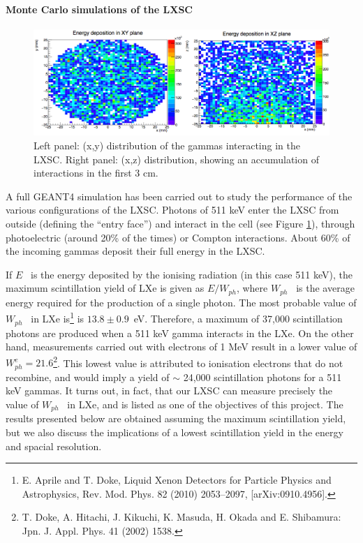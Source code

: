 \paragraph{Monte Carlo simulations of the LXSC}

\begin{figure}[!htb]
	\centering
	\includegraphics[scale=0.5]{img/gammas.png}
	\caption{\label{fig.gammas}  Left panel: (x,y) distribution of the gammas interacting in the LXSC. Right panel: (x,z) distribution, showing an accumulation of interactions in the first 3 cm.  }
\end{figure}

A full GEANT4 simulation has been carried out to study the performance of the various configurations of the LXSC. Photons of 511 keV enter the LXSC from outside (defining the ``entry face'') and interact in the cell (see Figure \ref{fig.gammas}), through photoelectric (around 20\% of the times) or Compton interactions. About 60\% of the incoming gammas deposit their full energy in the LXSC. 

If $E$~ is the energy deposited by the ionising radiation (in this case 511 keV), the maximum scintillation yield of LXe is given as $E/W_{ph}$, where $W_{ph}$~ is the average energy required for the production of a single photon. The most probable value of $W_{ph}$~ in LXe  is\footnote{E. Aprile and T. Doke, Liquid Xenon Detectors for Particle Physics and Astrophysics, Rev. Mod. Phys. 82 (2010) 2053–2097, [arXiv:0910.4956].} is $13.8 \pm 0.9$~eV. Therefore, a maximum of 37,000 scintillation photons are produced when a 511 keV gamma interacts in the LXe. On the other hand, measurements carried out with electrons of 1 MeV result in a lower value of $W_{ph}^e = 21.6$\footnote{T. Doke, A. Hitachi, J. Kikuchi, K. Masuda, H. Okada and E. Shibamura: Jpn. J. Appl. Phys. 41 (2002) 1538.}. This lowest value is attributed to ionisation electrons that do not recombine, and would imply a yield of $\sim$ 24,000 scintillation photons for a 511 keV gammas. It turns out, in fact, that our LXSC can measure precisely the value of $W_{ph}$~ in LXe, and is listed as one of the objectives of this project. The results presented below are obtained assuming the maximum scintillation yield, but we also discuss the implications of a lowest scintillation yield in the energy and spacial resolution. 

